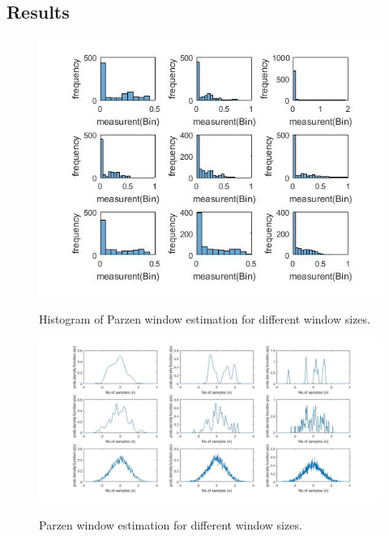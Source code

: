 \begin{spacing}{1.5}
\section{Results}
\begin{figure}[h]
\label{fig:Parzen window }
  \centering
  {\includegraphics[scale=.7]{Images/histogram of parzen window.jpg} }
  \caption{Histogram of Parzen window estimation for different window sizes.}
\end{figure}

\begin{figure}[h]
\label{fig:Parzen window }
  \centering
  {\includegraphics[scale=.38]{Images/parzen window(univarient).jpg} }
  \caption{Parzen window estimation for different window sizes.}
\end{figure}


\end{spacing} 